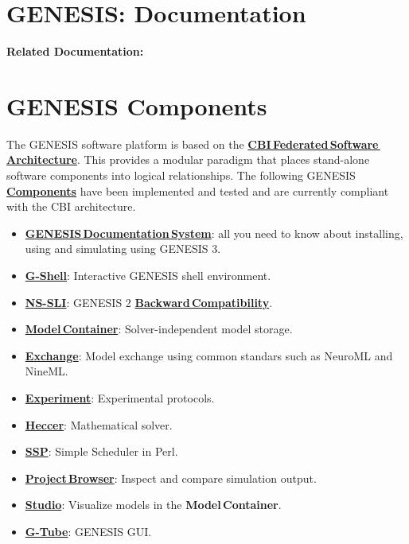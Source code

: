 \documentclass[12pt]{article}
\begin{document}
\section*{GENESIS: Documentation}

{\bf Related Documentation:}

\section*{GENESIS Components}

The GENESIS software platform is based on the \href{../genesis-overview/genesis-overview.tex}{\bf CBI\,Federated\,Software\,Architecture}. This provides a modular paradigm that places stand-alone software components into logical relationships. The following GENESIS \href{../reserved-words/reserved-words.tex}{\bf Components} have been implemented and tested and are currently compliant with the CBI architecture.

\begin{itemize}
   \item[]\href{../documentation-overview/documentation-overview.tex}{\bf GENESIS\,Documentation\,System}: all you need to know about installing, using and simulating using GENESIS 3.
   \item[]\href{../gshell/gshell.tex}{\bf G-Shell}: Interactive GENESIS shell environment.
   \item[]\href{../ns-sli/ns-sli.tex}{\bf NS-SLI}: GENESIS 2 \href{../backward-compatibility/backward-compatibility.tex}{\bf Backward\,Compatibility}.
   \item[]\href{../model-container/model-container.tex}{\bf Model\,Container}: Solver-independent model storage.
   \item[]\href{../exchange/exchange.tex}{\bf Exchange}: Model exchange using common standars such as NeuroML and NineML.
   \item[]\href{../experiment/experiment.tex}{\bf Experiment}: Experimental protocols.
   \item[]\href{../heccer/heccer.tex}{\bf Heccer}: Mathematical solver.
   \item[]\href{../ssp/ssp.tex}{\bf SSP}: Simple Scheduler in Perl.
   \item[]\href{../project-browser/project-browser.tex}{\bf Project\,Browser}: Inspect and compare simulation output.
   \item[]\href{../studio/studio.tex}{\bf Studio}: Visualize models in the {\bf Model\,Container}.
   \item[]\href{../gtube/gtube.tex}{\bf G-Tube}: GENESIS GUI.
\end{itemize}
\end{document}
